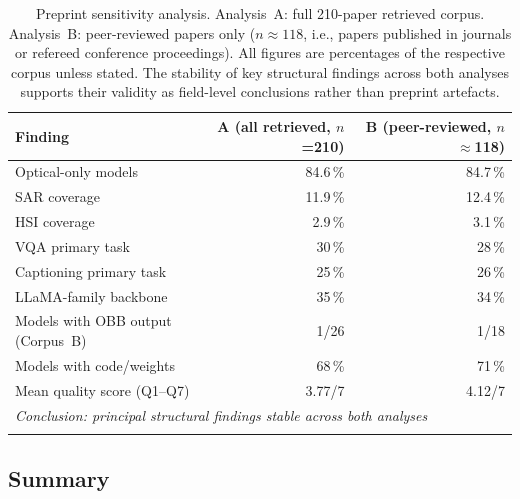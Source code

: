 \begin{table}[h]
\caption{Preprint sensitivity analysis. Analysis~A: full 210-paper retrieved corpus.
Analysis~B: peer-reviewed papers only ($n \approx 118$, i.e., papers published
in journals or refereed conference proceedings).
All figures are percentages of the respective corpus unless stated.
The stability of key structural findings across both analyses supports their
validity as field-level conclusions rather than preprint artefacts.
}\label{tab:sensitivity}
\small\setlength\tabcolsep{4pt}
\begin{tabular*}{\textwidth}{@{\extracolsep\fill}p{4.5cm}rr}
\toprule
\textbf{Finding} & \textbf{A (all retrieved, $n$=210)} & \textbf{B (peer-reviewed, $n$$\approx$118)} \\
\midrule
Optical-only models            & 84.6\,\%  & 84.7\,\% \\
SAR coverage                   & 11.9\,\%  & 12.4\,\% \\
HSI coverage                   & 2.9\,\%   & 3.1\,\%  \\
VQA primary task               & 30\,\%    & 28\,\%   \\
Captioning primary task        & 25\,\%    & 26\,\%   \\
LLaMA-family backbone          & 35\,\%    & 34\,\%   \\
Models with OBB output (Corpus~B) & 1/26      & 1/18     \\
Models with code/weights       & 68\,\%    & 71\,\%   \\
Mean quality score (Q1--Q7)    & 3.77/7    & 4.12/7   \\
\midrule
\multicolumn{3}{l}{\textit{Conclusion: principal structural findings stable across both analyses}} \\
\botrule
\end{tabular*}
\end{table}

\subsection*{Summary}

